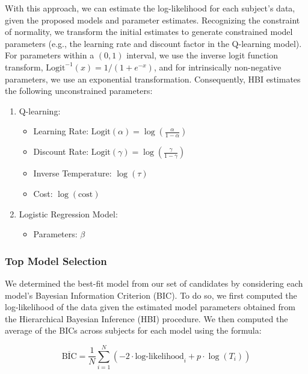 \documentclass[
  number,
  preprint,
  3p,
  onecolumn]{elsarticle}
\providecommand{\tightlist}{%
  \setlength{\itemsep}{0pt}\setlength{\parskip}{0pt}}\usepackage{longtable,booktabs,array}
\begin{document}
With this approach, we can estimate the log-likelihood for each
subject's data, given the proposed models and parameter estimates.
Recognizing the constraint of normality, we transform the initial
estimates to generate constrained model parameters (e.g., the learning
rate and discount factor in the Q-learning model). For parameters within
a \((0,1)\) interval, we use the inverse logit function transform,
\(\text{Logit}^{-1}(x)=1/(1+e^{-x})\), and for intrinsically
non-negative parameters, we use an exponential transformation.
Consequently, HBI estimates the following unconstrained parameters:

\begin{enumerate}
\def\labelenumi{\arabic{enumi}.}
\tightlist
\item
  Q-learning:

  \begin{itemize}
  \tightlist
  \item
    Learning Rate:
    \(\text{Logit}(\alpha)=\log(\frac{\alpha}{1-\alpha})\)
  \item
    Discount Rate:
    \(\text{Logit}(\gamma)=\log(\frac{\gamma}{1-\gamma})\)
  \item
    Inverse Temperature: \(\log(\tau)\)
  \item
    Cost: \(\log(\text{cost})\)
  \end{itemize}
\item
  Logistic Regression Model:

  \begin{itemize}
  \tightlist
  \item
    Parameters: \(\beta\)
  \end{itemize}
\end{enumerate}

\subsubsection{Top Model Selection}\label{top-model-selection-1}

We determined the best-fit model from our set of candidates by
considering each model's Bayesian Information Criterion (BIC). To do so,
we first computed the log-likelihood of the data given the estimated
model parameters obtained from the Hierarchical Bayesian Inference (HBI)
procedure. We then computed the average of the BICs across subjects for
each model using the formula:

\[
\overline{\text{BIC}} = \frac{1}{N} \sum_{i=1}^{N} \left( -2 \cdot \text{log-likelihood}_i + p \cdot \log(T_i) \right)
\]
\end{document}
